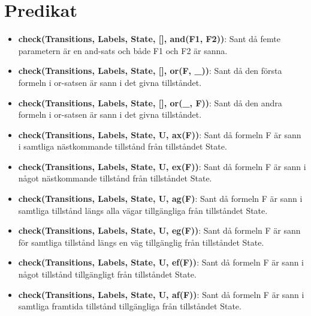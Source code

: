 \documentclass{article}
\begin{document}
  \begin{figure}[h!]
    
  \end{figure}

  \newpage

  \section{Predikat}

  \begin{itemize}

    \item \textbf{check(Transitions, Labels, State, [], and(F1, F2))}: Sant då
      femte parametern är en and-sats och både F1 och F2 är sanna.

    \item \textbf{check(Transitions, Labels, State, [], or(F, \_))}: Sant då
      den första formeln i or-satsen är sann i det givna tillståndet.

    \item \textbf{check(Transitions, Labels, State, [], or(\_, F))}: Sant då den
      andra formeln i or-satsen är sann i det givna tillståndet.

    \item \textbf{check(Transitions, Labels, State, U, ax(F))}: Sant då formeln
      F är sann i samtliga nästkommande tillstånd från tillståndet State.

    \item \textbf{check(Transitions, Labels, State, U, ex(F))}: Sant då formeln
      F är sann i något nästkommande tillstånd från tillståndet State.

    \item \textbf{check(Transitions, Labels, State, U, ag(F)}: Sant då formeln F
      är sann i samtliga tillstånd längs alla vägar tillgängliga från tillståndet
      State. 

    \item \textbf{check(Transitions, Labels, State, U, eg(F))}: Sant då formeln
      F är sann för samtliga tillstånd längs en väg tillgänglig från tillståndet
      State.

    \item \textbf{check(Transitions, Labels, State, U, ef(F))}: Sant då formeln
      F är sann i något tillstånd tillgängligt från tillståndet State.

    \item \textbf{check(Transitions, Labels, State, U, af(F))}: Sant då formeln
      F är sann i samtliga framtida tillstånd tillgängliga från tillståndet
      State.


\end{itemize}
\end{document}
